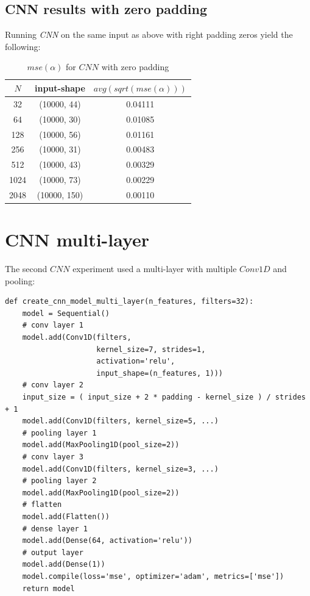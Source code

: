\documentclass[a4paper, 12pt]{report}
\begin{document}
\subsection{CNN results with zero padding}
\par Running \textit{CNN} on the same input as above with right padding zeros yield the following:
\begin{table}[h!]
    \centering
    \begin{tabular}{||c c c||} 
        \hline
        $N$ & input-shape & $avg(sqrt(mse(\alpha)))$ \\ [0.5ex] 
        \hline\hline
        32 & (10000, 44) & 0.04111 \\ 
        \hline
        64 & (10000, 30) & 0.01085 \\
        \hline
        128 & (10000, 56) & 0.01161 \\
        \hline
        256 & (10000, 31) & 0.00483 \\
        \hline
        512 & (10000, 43) & 0.00329 \\ 
        \hline
        1024 & (10000, 73) & 0.00229 \\ 
        \hline
        2048 & (10000, 150) & 0.00110 \\ 
        \hline
    \end{tabular}
    \caption{$mse(\alpha)$ for $CNN$ with zero padding}
    \label{table:4}
\end{table}

\section{CNN multi-layer}
The second $CNN$ experiment used a multi-layer with multiple $Conv1D$ and pooling:

\begin{verbatim}
def create_cnn_model_multi_layer(n_features, filters=32):
    model = Sequential()
    # conv layer 1
    model.add(Conv1D(filters,
                     kernel_size=7, strides=1, 
                     activation='relu', 
                     input_shape=(n_features, 1)))
    # conv layer 2
    input_size = ( input_size + 2 * padding - kernel_size ) / strides  + 1
    model.add(Conv1D(filters, kernel_size=5, ...) 
    # pooling layer 1
    model.add(MaxPooling1D(pool_size=2))
    # conv layer 3
    model.add(Conv1D(filters, kernel_size=3, ...) 
    # pooling layer 2
    model.add(MaxPooling1D(pool_size=2))
    # flatten
    model.add(Flatten())
    # dense layer 1
    model.add(Dense(64, activation='relu'))
    # output layer
    model.add(Dense(1))
    model.compile(loss='mse', optimizer='adam', metrics=['mse'])
    return model
\end{verbatim}
\end{document}
